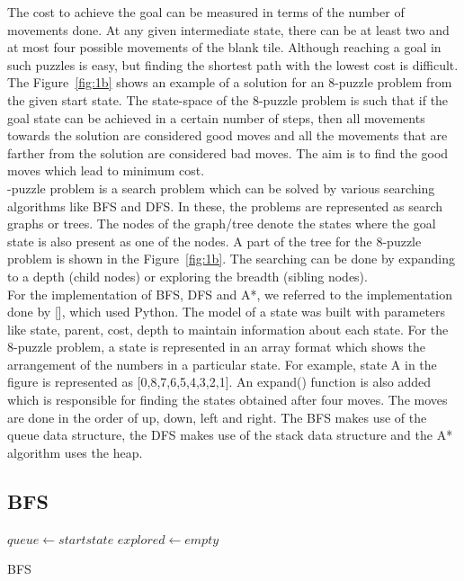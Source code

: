 \documentclass{svproc}
\begin{document}
\noindent The cost to achieve the goal can be measured in terms of the number of movements done. At any given intermediate state, there can be at least two and at most four possible movements of the blank tile. Although reaching a goal in such puzzles is easy, but finding the shortest path with the lowest cost is difficult. The Figure~\ref{fig:1b} shows an example of a solution for an 8-puzzle problem from the given start state. The state-space of the 8-puzzle problem is such that if the goal state can be achieved in a certain number of steps, then all movements towards the solution are considered good moves and all the movements that are farther from the solution are considered bad moves. The aim is to find the good moves which lead to minimum cost. \\

-puzzle problem is a search problem which can be solved by various searching algorithms like BFS and DFS. In these, the problems are represented as search graphs or trees. The nodes of the graph/tree denote the states where the goal state is also present as one of the nodes. A part of the tree for the 8-puzzle problem is shown in the Figure~\ref{fig:1b}. The searching can be done by expanding to a depth (child nodes) or exploring the breadth (sibling nodes). \\

\noindent For the implementation of BFS, DFS and A*, we referred to the implementation done by [], which used Python. The model of a state was built with parameters like state, parent, cost, depth to maintain information about each state. For the 8-puzzle problem, a state is represented in an array format which shows the arrangement of the numbers in a particular state. For example, state A in the figure is represented as [0,8,7,6,5,4,3,2,1]. An expand() function is also added which is responsible for finding the states obtained after four moves. The moves are done in the order of up, down, left and right. The BFS makes use of the queue data structure, the DFS makes use of the stack data structure and the A* algorithm uses the heap.

\subsection{BFS}
\setlength{\intextsep}{5pt}
\begin{algorithm}
	\SetAlgoLined
	 $queue \gets start state$\;
	 $explored \gets empty$\;
	\caption{BFS}
\end{algorithm}
\end{document}
